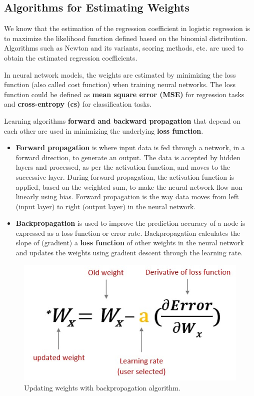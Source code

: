 \documentclass[
]{book}
\begin{document}
\hypertarget{algorithms-for-estimating-weights}{%
\subsection{Algorithms for Estimating Weights}\label{algorithms-for-estimating-weights}}

We know that the estimation of the regression coefficient in logistic regression is to maximize the likelihood function defined based on the binomial distribution. Algorithms such as Newton and its variants, scoring methods, etc. are used to obtain the estimated regression coefficients.

In neural network models, the weights are estimated by minimizing the loss function (also called cost function) when training neural networks. The loss function could be defined as \textbf{mean square error (MSE)} for regression tasks and \textbf{cross-entropy (cs)} for classification tasks.

Learning algorithms \textbf{forward and backward propagation} that depend on each other are used in minimizing the underlying \textbf{loss function}.

\begin{itemize}
\item
  \textbf{Forward propagation} is where input data is fed through a network, in a forward direction, to generate an output. The data is accepted by hidden layers and processed, as per the activation function, and moves to the successive layer. During forward propagation, the activation function is applied, based on the weighted sum, to make the neural network flow non-linearly using bias. Forward propagation is the way data moves from left (input layer) to right (output layer) in the neural network.
\item
  \textbf{Backpropagation} is used to improve the prediction accuracy of a node is expressed as a loss function or error rate. Backpropagation calculates the slope of (gradient) a \textbf{loss function} of other weights in the neural network and updates the weights using gradient descent through the learning rate.
\end{itemize}

\begin{figure}

{\centering \includegraphics[width=0.6\linewidth]{img07/w07-backpropagationGradient} 

}

\caption{Updating weights with backpropagation algorithm.}\label{fig:unnamed-chunk-145}
\end{figure}
\end{document}

